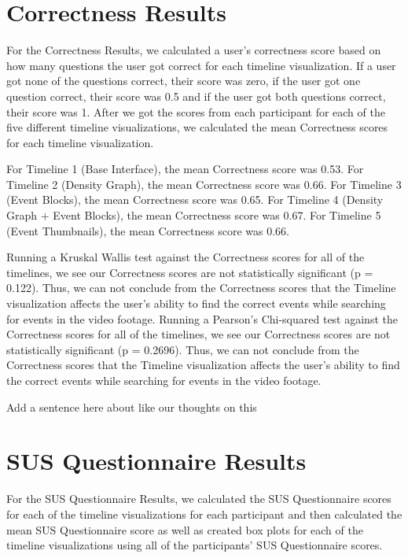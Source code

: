 \documentclass[doublespace,draft,nopageskip]{VTthesis} %
\begin{document}
\section{Correctness Results}
For the Correctness Results, we calculated a user's correctness score based on how many questions the user got correct for each timeline visualization. If a user got none of the questions correct, their score was zero, if the user got one question correct, their score was 0.5 and if the user got both questions correct, their score was 1. After we got the scores from each participant for each of the five different timeline visualizations, we calculated the mean Correctness scores for each timeline visualization. 

For Timeline 1 (Base Interface), the mean Correctness score was 0.53. For Timeline 2 (Density Graph), the mean Correctness score was 0.66. For Timeline 3 (Event Blocks), the mean Correctness score was 0.65. For Timeline 4 (Density Graph + Event Blocks), the mean Correctness score was 0.67. For Timeline 5 (Event Thumbnails), the mean Correctness score was 0.66. 

Running a Kruskal Wallis test against the Correctness scores for all of the timelines, we see our Correctness scores are not statistically significant (p = 0.122). Thus, we can not conclude from the Correctness scores that the Timeline visualization affects the user's ability to find the correct events while searching for events in the video footage.
Running a Pearson's Chi-squared test against the Correctness scores for all of the timelines, we see our Correctness scores are not statistically significant (p = 0.2696). Thus, we can not conclude from the Correctness scores that the Timeline visualization affects the user's ability to find the correct events while searching for events in the video footage.

Add a sentence here about like our thoughts on this

\section{SUS Questionnaire Results}

For the SUS Questionnaire Results, we calculated the SUS Questionnaire scores for each of the timeline visualizations for each participant and then calculated the mean SUS Questionnaire score as well as created box plots for each of the timeline visualizations using all of the participants' SUS Questionnaire scores.
\end{document}
